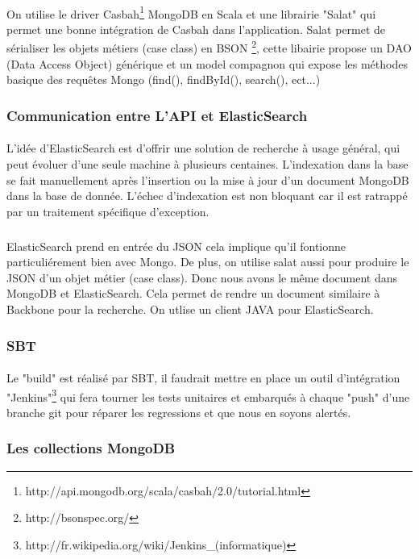 \paragraph{}
On utilise le driver Casbah\footnote{http://api.mongodb.org/scala/casbah/2.0/tutorial.html} MongoDB en Scala et une librairie "Salat" qui permet une bonne intégration de Casbah dans l'application.
Salat permet de sérialiser les objets métiers (case class) en BSON \footnote{http://bsonspec.org/}, cette libairie propose un DAO (Data Access Object) générique et un model compagnon qui expose les méthodes basique des requêtes Mongo (find(), findById(), search(), ect...)
\subsubsection{Communication entre L'API et ElasticSearch}
\paragraph{}
L’idée d’ElasticSearch est d’offrir une solution de recherche à usage général, qui peut évoluer d’une seule machine à plusieurs centaines.  
L'indexation dans la base se fait manuellement après l'insertion ou la mise à jour d'un document MongoDB dans la base de donnée.
L'échec d'indexation est non bloquant car il est ratrappé par un traitement spécifique d'exception.
\subparagraph{}
ElasticSearch prend en entrée du JSON cela implique qu'il fontionne particuliérement bien avec Mongo.
De plus, on utilise salat aussi pour produire le JSON d'un objet métier (case class).
Donc nous avons le même document dans MongoDB et ElasticSearch. Cela permet de rendre un document similaire à Backbone pour la recherche.
On utlise un client JAVA pour ElasticSearch.
\subsubsection{SBT}
\paragraph{}
Le "build" est réalisé par SBT, il faudrait mettre en place un outil d'intégration "Jenkins"\footnote{http://fr.wikipedia.org/wiki/Jenkins\_(informatique)} qui fera tourner les tests unitaires et embarqués à chaque "push" d'une branche git pour réparer les regressions et que nous en soyons alertés.
\subsubsection{Les collections MongoDB}
